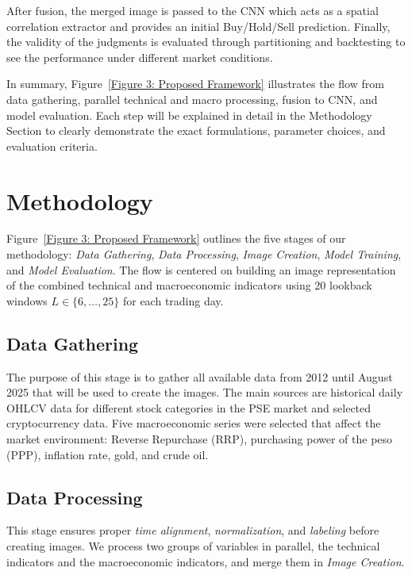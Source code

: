 \documentclass[12pt,a4paper]{article}
\begin{document}
After fusion, the merged image is passed to the CNN which acts as a spatial correlation extractor and provides an initial Buy/Hold/Sell prediction. Finally, the validity of the judgments is evaluated through partitioning and backtesting to see the performance under different market conditions.

In summary, Figure~\ref{Figure 3: Proposed Framework} illustrates the flow from data gathering, parallel technical and macro processing, fusion to CNN, and model evaluation. Each step will be explained in detail in the Methodology Section to clearly demonstrate the exact formulations, parameter choices, and evaluation criteria.

\section{Methodology}
\label{sec:methodology}

Figure~\ref{Figure 3: Proposed Framework} outlines the five stages of our methodology: \emph{Data Gathering}, \emph{Data Processing}, \emph{Image Creation}, \emph{Model Training}, and \emph{Model Evaluation}. The flow is centered on building an image representation of the combined technical and macroeconomic indicators using 20 lookback windows $L \in \{6,\ldots,25\}$ for each trading day.


\subsection{Data Gathering}
\label{subsec:data-gathering}

The purpose of this stage is to gather all available data from 2012 until August 2025 that will be used to create the images. The main sources are historical daily OHLCV data for different stock categories in the PSE market and selected cryptocurrency data. Five macroeconomic series were selected that affect the market environment: Reverse Repurchase (RRP), purchasing power of the peso (PPP), inflation rate, gold, and crude oil.

\subsection{Data Processing} \label{subsec:data-processing}
This stage ensures proper \emph{time alignment}, \emph{normalization}, and \emph{labeling} before creating images. We process two groups of variables in parallel, the technical indicators and the macroeconomic indicators, and merge them in \emph{Image Creation}.
\end{document}
